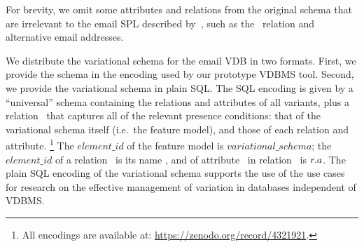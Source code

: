 %
For brevity, we omit some attributes and relations from the original schema
that are irrelevant to the email SPL described by~\citet{Hall05},
such as the \ relation and alternative email addresses. 
%


We distribute the variational schema for the email VDB in two formats.
First, we provide the schema in the encoding used by our prototype VDBMS tool.%
%
Second, 
we provide the variational schema in plain SQL.
%
The SQL encoding is given by a ``universal'' schema containing the relations and
attributes of all variants, plus a relation
\vdbpc\ that captures all of the relevant presence conditions:
that of the variational schema itself (i.e.\ the feature model), and those of each
 relation and attribute.%
 \footnote{All encodings are available at: \url{https://zenodo.org/record/4321921}.} 
%
 The $\mathit{element\_id}$ of the feature model is
 $\mathit{variational\_schema}$; the $\mathit{element\_id}$ of a relation \vRel\
 is its name \vRel, and of attribute \vAtt\ in relation \vRel\ is $\vRel.\vAtt$.
%
The plain SQL encoding of the variational schema supports the use
of the use cases for research on the effective management of variation in
databases independent of VDBMS.

